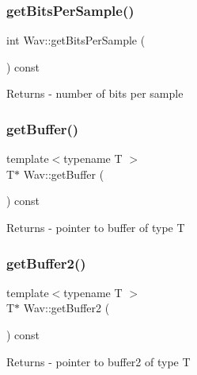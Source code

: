 \subsubsection{\texorpdfstring{get\+Bits\+Per\+Sample()}{getBitsPerSample()}}
{\footnotesize\ttfamily int Wav\+::get\+Bits\+Per\+Sample (\begin{DoxyParamCaption}{ }\end{DoxyParamCaption}) const}

\begin{DoxyReturn}{Returns}
-\/ number of bits per sample 
\end{DoxyReturn}
\mbox{\label{classWav_ac236b8cc7453f5dd6cc0623b5c200bee}} 
\subsubsection{\texorpdfstring{get\+Buffer()}{getBuffer()}}
{\footnotesize\ttfamily template$<$typename T $>$ \\
T$\ast$ Wav\+::get\+Buffer (\begin{DoxyParamCaption}{ }\end{DoxyParamCaption}) const\hspace{0.3cm}{\ttfamily [inline]}}

\begin{DoxyReturn}{Returns}
-\/ pointer to buffer of type T 
\end{DoxyReturn}
\mbox{\label{classWav_aca22bfd496dad7ecf80e17a691ab1c4c}} 
\subsubsection{\texorpdfstring{get\+Buffer2()}{getBuffer2()}}
{\footnotesize\ttfamily template$<$typename T $>$ \\
T$\ast$ Wav\+::get\+Buffer2 (\begin{DoxyParamCaption}{ }\end{DoxyParamCaption}) const\hspace{0.3cm}{\ttfamily [inline]}}

\begin{DoxyReturn}{Returns}
-\/ pointer to buffer2 of type T 
\end{DoxyReturn}
\mbox{\label{classWav_a71fdfa1d9f5e7c1b86f07bbff4249dca}} 
